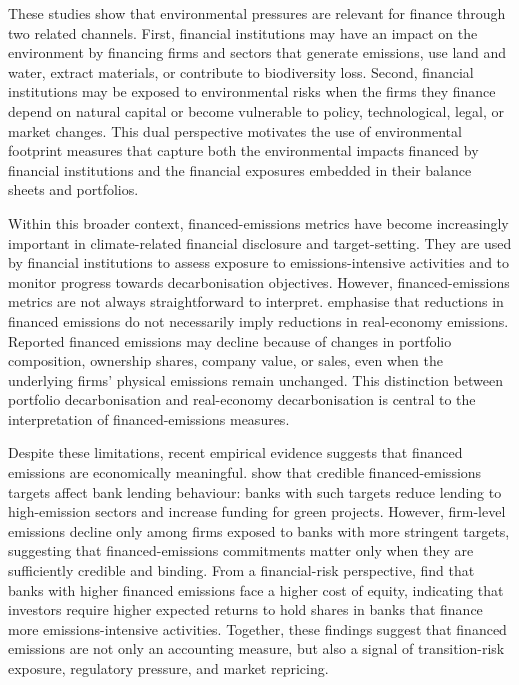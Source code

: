 These studies show that environmental pressures are relevant for finance through two related channels. First, financial institutions may have an impact on the environment by financing firms and sectors that generate emissions, use land and water, extract materials, or contribute to biodiversity loss. Second, financial institutions may be exposed to environmental risks when the firms they finance depend on natural capital or become vulnerable to policy, technological, legal, or market changes. This dual perspective motivates the use of environmental footprint measures that capture both the environmental impacts financed by financial institutions and the financial exposures embedded in their balance sheets and portfolios.

Within this broader context, financed-emissions metrics have become increasingly important in climate-related financial disclosure and target-setting. They are used by financial institutions to assess exposure to emissions-intensive activities and to monitor progress towards decarbonisation objectives. However, financed-emissions metrics are not always straightforward to interpret. \textcite{fraser_net-zero_2023} emphasise that reductions in financed emissions do not necessarily imply reductions in real-economy emissions. Reported financed emissions may decline because of changes in portfolio composition, ownership shares, company value, or sales, even when the underlying firms' physical emissions remain unchanged. This distinction between portfolio decarbonisation and real-economy decarbonisation is central to the interpretation of financed-emissions measures.

Despite these limitations, recent empirical evidence suggests that financed emissions are economically meaningful. \textcite{emin_financed_2025} show that credible financed-emissions targets affect bank lending behaviour: banks with such targets reduce lending to high-emission sectors and increase funding for green projects. However, firm-level emissions decline only among firms exposed to banks with more stringent targets, suggesting that financed-emissions commitments matter only when they are sufficiently credible and binding. From a financial-risk perspective, \textcite{pasiouras_financed_2025} find that banks with higher financed emissions face a higher cost of equity, indicating that investors require higher expected returns to hold shares in banks that finance more emissions-intensive activities. Together, these findings suggest that financed emissions are not only an accounting measure, but also a signal of transition-risk exposure, regulatory pressure, and market repricing.


